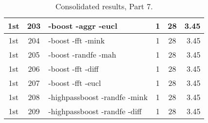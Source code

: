 \begin{table}
\begin{minipage}[b]{\textwidth}
\begin{tabular}{|c|c|l|c|c|r|}
1st & 203 & -boost -aggr -eucl  & 1 & 28 & 3.45\\ \hline
1st & 204 & -boost -fft -mink  & 1 & 28 & 3.45\\ \hline
1st & 205 & -boost -randfe -mah  & 1 & 28 & 3.45\\ \hline
1st & 206 & -boost -fft -diff  & 1 & 28 & 3.45\\ \hline
1st & 207 & -boost -fft -eucl  & 1 & 28 & 3.45\\ \hline
1st & 208 & -highpassboost -randfe -mink  & 1 & 28 & 3.45\\ \hline
1st & 209 & -highpassboost -randfe -diff  & 1 & 28 & 3.45\\ \hline
\end{tabular}
\end{minipage}
\caption{Consolidated results, Part 7.}
\label{tab:results7}
\end{table}

